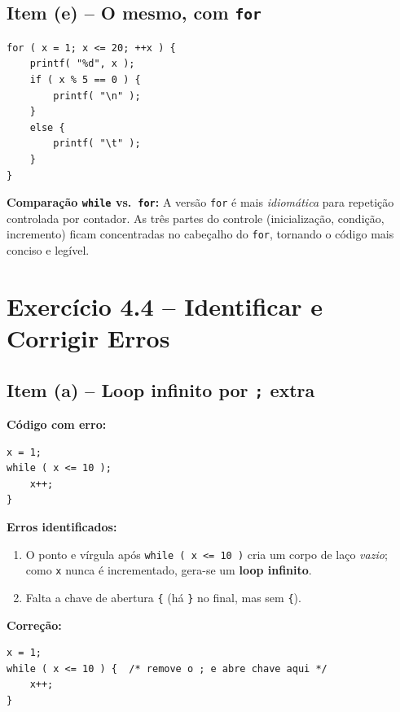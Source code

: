 \documentclass[12pt,a4paper]{article}
\begin{document}
\subsection*{Item (e) -- O mesmo, com \texttt{for}}

\begin{respostabox}
\begin{lstlisting}
for ( x = 1; x <= 20; ++x ) {
    printf( "%d", x );
    if ( x % 5 == 0 ) {
        printf( "\n" );
    }
    else {
        printf( "\t" );
    }
}
\end{lstlisting}

\textbf{Comparação \texttt{while} vs.\ \texttt{for}:} A versão \texttt{for} é mais
\textit{idiomática} para repetição controlada por contador. As três partes do controle
(inicialização, condição, incremento) ficam concentradas no cabeçalho do \texttt{for},
tornando o código mais conciso e legível.
\end{respostabox}

\newpage

\section{Exercício 4.4 -- Identificar e Corrigir Erros}

\subsection*{Item (a) -- Loop infinito por \texttt{;} extra}

\begin{respostabox}
\textbf{Código com erro:}
\begin{lstlisting}
x = 1;
while ( x <= 10 );
    x++;
}
\end{lstlisting}

\textbf{Erros identificados:}
\begin{enumerate}[noitemsep]
  \item O ponto e vírgula após \texttt{while ( x <= 10 )} cria um corpo de laço \textit{vazio};
  como \texttt{x} nunca é incrementado, gera-se um \textbf{loop infinito}.
  \item Falta a chave de abertura \texttt{\{} (há \texttt{\}} no final, mas sem \texttt{\{}).
\end{enumerate}

\textbf{Correção:}
\begin{lstlisting}
x = 1;
while ( x <= 10 ) {  /* remove o ; e abre chave aqui */
    x++;
}
\end{lstlisting}
\end{respostabox}
\end{document}
